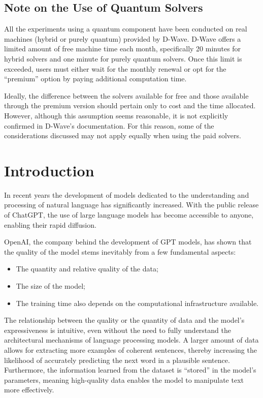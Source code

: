 \section*{Note on the Use of Quantum Solvers}

All the experiments using a quantum component have been conducted on real machines (hybrid or purely quantum) provided by D-Wave.
D-Wave offers a limited amount of free machine time each month, specifically 20 minutes for hybrid solvers and one minute for purely quantum solvers.
Once this limit is exceeded, users must either wait for the monthly renewal or opt for the ``premium'' option by paying additional computation time.

Ideally, the difference between the solvers available for free and those available through the premium version should pertain only to cost and the time allocated.
However, although this assumption seems reasonable, it is not explicitly confirmed in D-Wave's documentation.
For this reason, some of the considerations discussed may not apply equally when using the paid solvers.

\chapter{Introduction}

In recent years the development of models dedicated to the understanding and processing of natural language has significantly increased. 
With the public release of ChatGPT\cite{chatgpt}, the use of large language models has become accessible to anyone, enabling their rapid diffusion.

OpenAI, the company behind the development of GPT models, has shown\cite{scaling} that the quality of the model stems inevitably from a few fundamental aspects:
\begin{itemize}
    \item The quantity and relative quality of the data;
    \item The size of the model;
    \item The training time also depends on the computational infrastructure available.
\end{itemize}

The relationship between the quality or the quantity of data and the model's expressiveness is intuitive, even without the need to fully understand the architectural mechanisms of language processing models. 
A larger amount of data allows for extracting more examples of coherent sentences, thereby increasing the likelihood of accurately predicting the next word in a plausible sentence.
Furthermore, the information learned from the dataset is ``stored'' in the model's parameters, meaning high-quality data enables the model to manipulate text more effectively.

